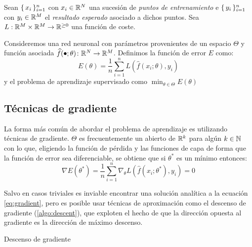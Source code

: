 \begin{definition}
    Sean \( \{\,x_{i}\,\}_{i = 1}^n \) con \( x_{i} \in \mathbb{R}^{N} \) una sucesión de \textit{puntos de entrenamiento} e \( \{\, y_{i} \,\}_{i = 1}^n \) con \( y_{i} \in \mathbb{R}^{M} \) el \textit{resultado esperado} asociado a dichos puntos. Sea \( L: \mathbb{R}^{M} \times \mathbb{R}^{M} \to \mathbb{R}^{\geq 0} \) una función de coste.
    
    Consideremos una red neuronal con parámetros provenientes de un espacio \( \Theta \) y función asociada \( \widehat{f}(\smallbullet; \theta) \colon \real{N} \to \real{M} \). Definimos la función de error \( E \) como:
    \[
        E(\theta) = \frac{1}{n} \sum_{i = 1}^n L\left( \widehat{f}(x_{i}; \theta), y_{i} \right)
    \]
    y el problema de aprendizaje supervisado como \( \min_{\theta \in \Theta} E(\theta) \)
\end{definition}

\subsection{Técnicas de gradiente}
La forma más común de abordar el problema de aprendizaje es utilizando técnicas de gradiente. \( \Theta \) es frecuentemente un abierto de \( \mathbb{R}^{k} \) para algún \( k \in \mathbb{N} \) con lo que, eligiendo la función de pérdida y las funciones de capa de forma que la función de error sea diferenciable, se obtiene que si \( \theta^* \) es un mínimo entonces:
\begin{equation} \label{eq:gradient}
    \nabla E(\theta^*) = \frac{1}{n} \sum_{i = 1}^n \nabla_\theta L\left( \widehat{f}(x_{i}; \theta^*), y_{i} \right) = 0
\end{equation}

Salvo en casos triviales es inviable encontrar una solución analítica a la ecuación \eqref{eq:gradient}, pero es posible usar técnicas de aproximación como el descenso de gradiente (\cref{algo:descent}), que exploten el hecho de que la dirección opuesta al gradiente es la dirección de máximo descenso.

\begin{algorithm}
    \SetAlgoLined
    \caption{Descenso de gradiente}
    \label{algo:descent}
\end{algorithm}

